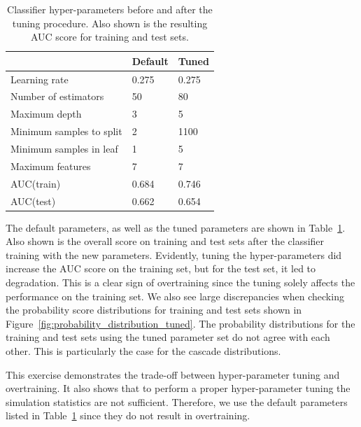 \begin{table}[h]
    \centering
    \begin{tabular} { l || l | l}
        & Default & Tuned \\
        \hline \hline 
        Learning rate & 0.275 & 0.275    \\
        Number of estimators & 50 & 80 \\
        Maximum depth & 3 & 5 \\
        Minimum samples to split & 2 & 1100 \\
        Minimum samples in leaf & 1 & 5 \\
        Maximum features & 7 & 7 \\
        \hline
        AUC(train) & 0.684 & 0.746 \\
        AUC(test) & 0.662 & 0.654
    \end{tabular}
    \caption[Classifier hyper-parameters]{Classifier hyper-parameters before and after the tuning procedure. Also shown is the resulting AUC score for training and test sets.}   
    \label{tab:parameter_tuning}
\end{table}

The default parameters, as well as the tuned parameters are shown in Table~\ref{tab:parameter_tuning}.
Also shown is the overall score on training and test sets after the classifier training with the new parameters.
Evidently, tuning the hyper-parameters did increase the AUC score on the training set, but for the test set, it led to degradation.
This is a clear sign of overtraining since the tuning solely affects the performance on the training set.
We also see large discrepancies when checking the probability score distributions for training and test sets shown in Figure~\ref{fig:probability_distribution_tuned}.
The probability distributions for the training and test sets using the tuned parameter set do not agree with each other.
This is particularly the case for the cascade distributions.

This exercise demonstrates the trade-off between hyper-parameter tuning and overtraining.
It also shows that to perform a proper hyper-parameter tuning the simulation statistics are not sufficient.
Therefore, we use the default parameters listed in Table~\ref{tab:parameter_tuning} since they do not result in overtraining.

